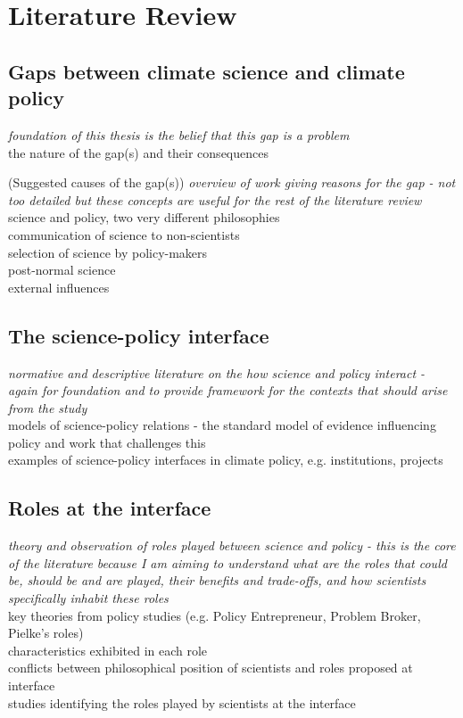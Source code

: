 \chapter{Literature Review}\label{ch:lit}

\section{Gaps between climate science and climate policy}\label{sec:gaps}
\emph{foundation of this thesis is the belief that this gap is a problem} \\
the nature of the gap(s) and their consequences

(Suggested causes of the gap(s))
\emph{overview of work giving reasons for the gap - not too detailed but these concepts are useful for the rest of the literature review} \\
science and policy, two very different philosophies\\
communication of science to non-scientists\\
selection of science by policy-makers\\
post-normal science\\
external influences

\section{The science-policy interface}\label{sec:interface}
\emph{normative and descriptive literature on the how science and policy interact - again for foundation and to provide framework for the contexts that should arise from the study}\\
models of science-policy relations - the standard model of evidence influencing policy and work that challenges this\\
examples of science-policy interfaces in climate policy, e.g. institutions, projects

\section{Roles at the interface}\label{sec:roles}
\emph{theory and observation of roles played between science and policy - this is the core of the literature because I am aiming to understand what are the roles that could be, should be and are played, their benefits and trade-offs, and how scientists specifically inhabit these roles}\\
key theories from policy studies (e.g. Policy Entrepreneur, Problem Broker, Pielke’s roles)\\
characteristics exhibited in each role\\
conflicts between philosophical position of scientists and roles proposed at interface\\
studies identifying the roles played by scientists at the interface

